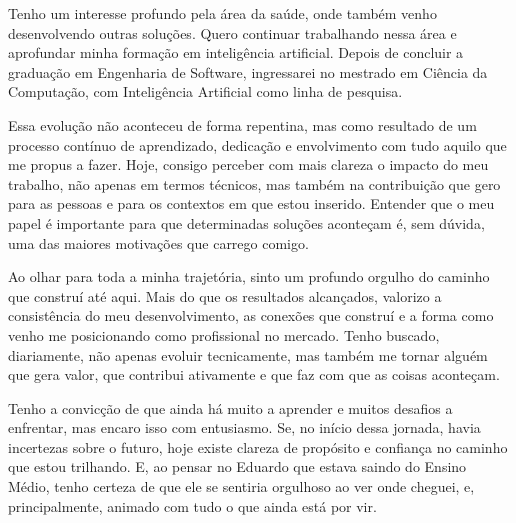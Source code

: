 \indent Tenho um interesse profundo pela área da saúde, onde também venho desenvolvendo outras soluções. Quero continuar trabalhando nessa área e aprofundar minha formação em inteligência artificial. Depois de concluir a \mbox{graduação} em Engenharia de Software, ingressarei no mestrado em Ciência da Computação, com Inteligência Artificial como linha de pesquisa.\par
\indent Essa evolução não aconteceu de forma repentina, mas como resultado de um processo contínuo de aprendizado, dedicação e envolvimento com tudo aquilo que me propus a fazer. Hoje, consigo perceber com mais clareza o impacto do meu trabalho, não apenas em termos técnicos, mas também na contribuição que gero para as pessoas e para os contextos em que estou inserido. Entender que o meu papel é importante para que determinadas soluções aconteçam é, sem dúvida, uma das maiores motivações que carrego comigo.\par
\indent Ao olhar para toda a minha trajetória, sinto um profundo orgulho do caminho que construí até aqui. Mais do que os resultados alcançados, valorizo a consistência do meu desenvolvimento, as conexões que construí e a forma como venho me posicionando como profissional no mercado. Tenho buscado, diariamente, não apenas evoluir tecnicamente, mas também me tornar alguém que gera valor, que contribui ativamente e que faz com que as coisas aconteçam.\par
\indent Tenho a convicção de que ainda há muito a aprender e muitos desafios a enfrentar, mas encaro isso com entusiasmo. Se, no início dessa jornada, havia incertezas sobre o futuro, hoje existe clareza de propósito e confiança no caminho que estou trilhando. E, ao pensar no Eduardo que estava saindo do Ensino Médio, tenho certeza de que ele se sentiria orgulhoso ao ver onde cheguei, e, principalmente, animado com tudo o que ainda está por vir.\par

